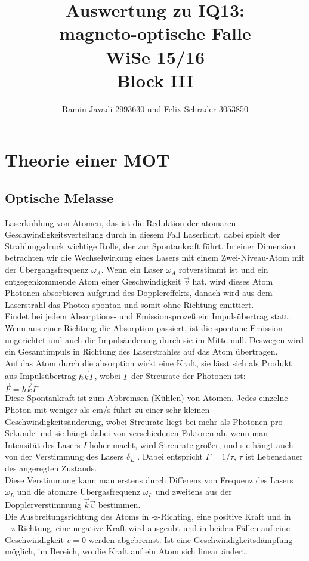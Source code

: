 \documentclass[12pt,a4paper]{article}
\title{Auswertung zu IQ13:\\
       magneto-optische Falle\\
       WiSe 15/16\\
       Block III}
\author{Ramin Javadi 2993630 und Felix Schrader 3053850}
\date{}
\begin{document}
\maketitle
\tableofcontents
\pagebreak
\section{Theorie einer MOT}
  \subsection{Optische Melasse}
  Laserkühlung von Atomen, das ist die Reduktion der atomaren Geschwindigkeitsverteilung durch in diesem Fall Laserlicht, dabei spielt der Strahlungsdruck wichtige Rolle, der zur Spontankraft führt. In einer Dimension betrachten wir die Wechselwirkung eines Lasers mit einem Zwei-Niveau-Atom mit der Übergangsfrequenz ${\omega_A}$. Wenn ein Laser ${\omega_A}$ rotverstimmt ist und ein entgegenkommende Atom einer Geschwindigkeit ${\vec v}$ hat, wird dieses Atom Photonen absorbieren aufgrund des Dopplereffekts, danach wird aus dem Laserstrahl das Photon spontan und somit ohne Richtung emittiert.
  \\Findet bei jedem Absorptions- und Emissionsprozeß ein Impulsübertrag statt. Wenn aus einer Richtung die Absorption passiert, ist die spontane Emission ungerichtet und auch die Impulsänderung durch sie im Mitte null. Deswegen wird ein Gesamtimpuls in Richtung des Laserstrahles auf das Atom übertragen.
  \\Auf das Atom durch die absorption wirkt eine Kraft, sie lässt sich als Produkt aus Impulsübertrag ${\hbar \vec k \Gamma}$, wobei ${\Gamma}$ der Streurate der Photonen ist: 
  \\${\vec F=\hbar \vec k \Gamma}$
  \\Diese Spontankraft ist zum Abbremsen (Kühlen) von Atomen. Jedes einzelne Photon mit weniger als cm/s führt zu einer sehr kleinen Geschwindigkeitsänderung, wobei Streurate liegt bei mehr als  Photonen pro Sekunde und sie hängt dabei von verschiedenen Faktoren ab. wenn man Intensität des Lasers ${I}$ höher macht, wird Streurate größer, und sie hängt auch von der Verstimmung des Lasers ${\delta_L}$ . Dabei entspricht ${\Gamma =1/ \tau}$, ${\tau}$ ist Lebensdauer des angeregten Zustands.
  \\Diese Verstimmung kann man erstens durch Differenz von Frequenz des Lasers ${\omega_L}$ und die atomare Übergasfrequenz ${\omega_L}$ und zweitens aus der Dopplerverstimmung ${\vec k \vec v}$ bestimmen.
  \\Die Ausbreitungsrichtung des Atoms in -z-Richting, eine positive Kraft und in +z-Richtung, eine negative Kraft wird ausgeübt und in beiden Fällen auf eine Geschwindigkeit ${v=0}$ werden abgebremst. Ist eine Geschwindigkeitsdämpfung möglich, im Bereich, wo die Kraft auf ein Atom sich linear ändert.     
\end{document}

